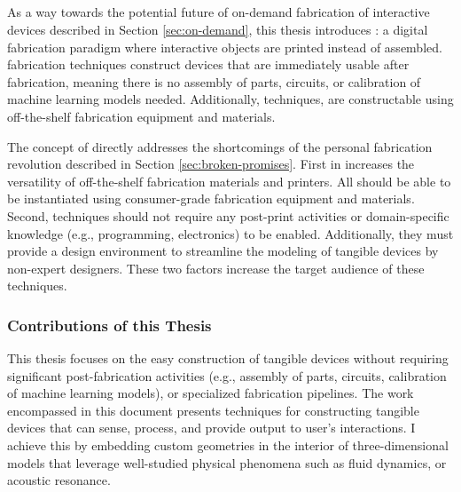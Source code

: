     \subsection{\papf}
      As a way towards the potential future of on-demand fabrication of
      interactive devices described in Section \ref{sec:on-demand}, this thesis
      introduces \papf: a digital fabrication paradigm where interactive objects
      are printed instead of assembled. \pap fabrication techniques construct
      devices that are immediately usable after fabrication, meaning there is no
      assembly of parts, circuits, or calibration of machine learning models
      needed. Additionally, \pap techniques, are constructable using
      off-the-shelf fabrication equipment and materials.

      The concept of \papf directly addresses the shortcomings of the personal
      fabrication revolution described in Section \ref{sec:broken-promises}.
      First in increases the versatility of off-the-shelf fabrication materials
      and printers. All \papf should be able to be instantiated using
      consumer-grade fabrication equipment and materials. Second, \pap
      techniques should not require any post-print activities or domain-specific
      knowledge (e.g., programming, electronics) to be enabled. Additionally,
      they must provide a design environment to streamline the modeling of
      tangible devices by non-expert designers. These two factors increase the
      target audience of these techniques.

      \subsubsection*{Contributions of this Thesis}
        This thesis focuses on the easy construction of tangible devices without
        requiring significant post-fabrication activities (e.g., assembly of
        parts, circuits, calibration of machine learning models), or specialized
        fabrication pipelines. The work encompassed in this document presents
        techniques for constructing tangible devices that can sense, process,
        and provide output to user's interactions. I achieve this by embedding
        custom geometries in the interior of three-dimensional models that
        leverage well-studied physical phenomena such as fluid dynamics, or
        acoustic resonance.
        
